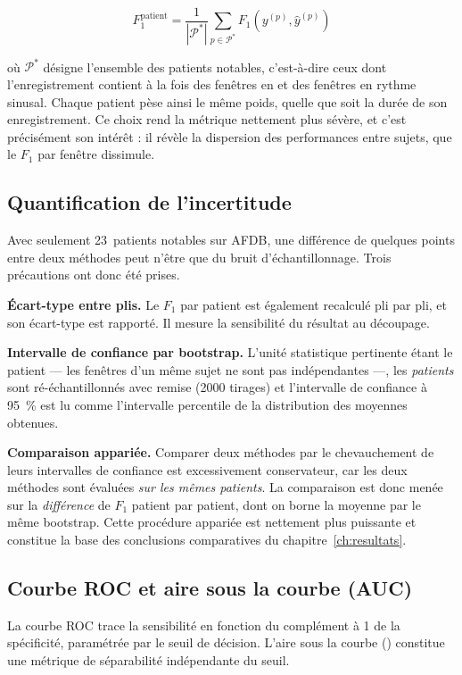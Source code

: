 \begin{equation}
  F_1^{\text{patient}} = \frac{1}{|\mathcal{P}^{*}|} \sum_{p \in \mathcal{P}^{*}} F_1\!\left(y^{(p)}, \hat{y}^{(p)}\right)
  \label{eq:meth:f1patient}
\end{equation}

\noindent où \(\mathcal{P}^{*}\) désigne l'ensemble des patients notables, c'est-à-dire ceux dont l'enregistrement contient à la fois des fenêtres en \FA{} et des fenêtres en rythme sinusal. Chaque patient pèse ainsi le même poids, quelle que soit la durée de son enregistrement. Ce choix rend la métrique nettement plus sévère, et c'est précisément son intérêt : il révèle la dispersion des performances entre sujets, que le \(F_1\) par fenêtre dissimule.

\subsection{Quantification de l'incertitude}
\label{sec:meth:incertitude}
Avec seulement 23~patients notables sur AFDB, une différence de quelques points entre deux méthodes peut n'être que du bruit d'échantillonnage. Trois précautions ont donc été prises.

\textbf{Écart-type entre plis.} Le \(F_1\) par patient est également recalculé pli par pli, et son écart-type est rapporté. Il mesure la sensibilité du résultat au découpage.

\textbf{Intervalle de confiance par bootstrap.} L'unité statistique pertinente étant le patient — les fenêtres d'un même sujet ne sont pas indépendantes —, les \emph{patients} sont ré-échantillonnés avec remise (\num{2000} tirages) et l'intervalle de confiance à 95~\% est lu comme l'intervalle percentile de la distribution des moyennes obtenues.

\textbf{Comparaison appariée.} Comparer deux méthodes par le chevauchement de leurs intervalles de confiance est excessivement conservateur, car les deux méthodes sont évaluées \emph{sur les mêmes patients}. La comparaison est donc menée sur la \emph{différence} de \(F_1\) patient par patient, dont on borne la moyenne par le même bootstrap. Cette procédure appariée est nettement plus puissante et constitue la base des conclusions comparatives du chapitre~\ref{ch:resultats}.

\subsection{Courbe ROC et aire sous la courbe (AUC)}
La courbe ROC trace la sensibilité en fonction du complément à 1 de la spécificité, paramétrée par le seuil de décision. L'aire sous la courbe (\AUROC{}) constitue une métrique de séparabilité indépendante du seuil.

